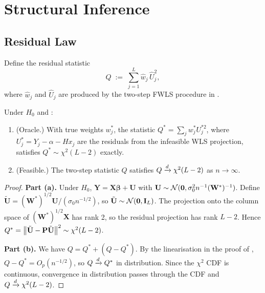 \section{Structural Inference}
\label{sec:test}

\subsection{Residual Law}

Define the residual statistic
\begin{equation}
    Q \;:=\; \sum_{j=1}^{L} \hat w_j \,\hat U_j^2,
    \label{eq:Q-stat}
\end{equation}
where $\hat w_j$ and $\hat U_j$ are produced by the two-step FWLS procedure in
.

\begin{theorem}
\label{thm:null-chi2}
Under $H_0$ and :
\begin{enumerate}[label=(\alph*)]
    \item \textup{(Oracle.)}  With true weights $w_j^*$, the statistic
    $Q^* = \sum_j w_j^* U_j^{*2}$, where $U_j^* = Y_j - \alpha - H x_j$
    are the residuals from the infeasible WLS projection,
    satisfies $Q^* \sim \chi^2(L-2)$ exactly.
    \item \textup{(Feasible.)}  The two-step statistic $Q$ satisfies
    $Q \xrightarrow{d} \chi^2(L-2)$ as $n \to \infty$.
\end{enumerate}
\end{theorem}

\begin{proof}
\textbf{Part (a).}  Under $H_0$, $\mathbf{Y} = \mathbf{X}\boldsymbol\beta +
\mathbf{U}$ with $\mathbf{U} \sim \mathcal{N}(\mathbf{0}, \sigma_0^2 n^{-1}
(\mathbf{W}^*)^{-1})$.  Define $\tilde{\mathbf{U}} =
(\mathbf{W}^*)^{1/2}\mathbf{U}/(\sigma_0 n^{-1/2})$, so $\tilde{\mathbf{U}}
\sim \mathcal{N}(\mathbf{0}, \mathbf{I}_L)$.  The projection onto the column
space of $(\mathbf{W}^*)^{1/2}\mathbf{X}$ has rank 2, so the residual
projection has rank $L-2$.  Hence $Q^* = \left\|\tilde{\mathbf{U}} -
\mathbf{P}\tilde{\mathbf{U}}\right\|^2 \sim \chi^2(L-2)$.

\textbf{Part (b).}  We have $Q = Q^* + (Q - Q^*)$.  By the linearisation
in the proof of , $Q - Q^* = O_p(n^{-1/2})$,
so $Q \xrightarrow{d} Q^*$ in distribution.  Since the $\chi^2$ CDF is continuous,
convergence in distribution passes through the CDF and $Q \xrightarrow{d} \chi^2(L-2)$.
\end{proof}

